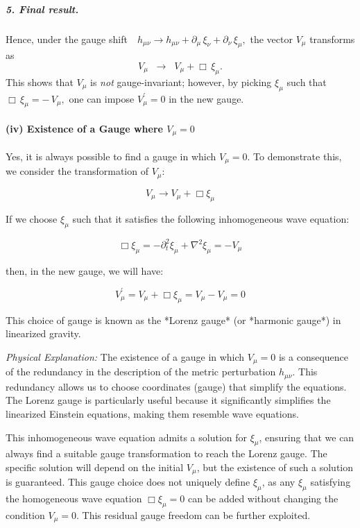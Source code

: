 \documentclass{article}
\begin{document}
\medskip

\noindent
\subparagraph{5. Final result.}
Hence, under the gauge shift 
\(\,h_{\mu\nu}\to h_{\mu\nu} + \partial_\mu\,\xi_\nu + \partial_\nu\,\xi_\mu,\)
the vector \(V_\mu\) transforms as
\[
\boxed{
  V_\mu
    \;\;\longrightarrow\;\;
  V_\mu + \Box\,\xi_\mu.
}
\]
This shows that \(V_\mu\) is \emph{not} gauge-invariant; however, by picking \(\xi_\mu\) such that
\(\Box\,\xi_\mu = -\,V_\mu,\) one can impose \(V_\mu^\prime=0\) in the new gauge.

\paragraph{(iv) Existence of a Gauge where $V_{\mu} = 0$}

Yes, it is always possible to find a gauge in which $V_{\mu} = 0$. To demonstrate this, we consider the transformation of $V_{\mu}$:

\begin{equation}
V_{\mu} \to V_{\mu} + \Box \xi_{\mu}
\end{equation}

If we choose $\xi_{\mu}$ such that it satisfies the following inhomogeneous wave equation:

\begin{equation}
\Box \xi_{\mu} = -\partial_t^2 \xi_\mu + \nabla^2 \xi_\mu = -V_{\mu}
\end{equation}

then, in the new gauge, we will have:

\begin{equation}
V_{\mu}^{\prime} = V_{\mu} + \Box \xi_{\mu} = V_{\mu} - V_{\mu} = 0
\end{equation}

This choice of gauge is known as the *Lorenz gauge* (or *harmonic gauge*) in linearized gravity.

\textit{Physical Explanation:} The existence of a gauge in which $V_{\mu} = 0$ is a consequence of the redundancy in the description of the metric perturbation $h_{\mu \nu}$. This redundancy allows us to choose coordinates (gauge) that simplify the equations. The Lorenz gauge is particularly useful because it significantly simplifies the linearized Einstein equations, making them resemble wave equations.

This inhomogeneous wave equation admits a solution for $\xi_\mu$, ensuring that we can always find a suitable gauge transformation to reach the Lorenz gauge. The specific solution will depend on the initial $V_\mu$, but the existence of such a solution is guaranteed. This gauge choice does not uniquely define $\xi_\mu$, as any $\xi_\mu$ satisfying the homogeneous wave equation $\Box \xi_\mu = 0$ can be added without changing the condition $V_\mu=0$. This residual gauge freedom can be further exploited.
\end{document}

